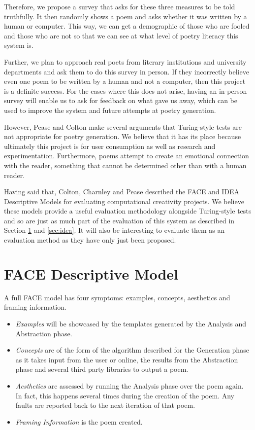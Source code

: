 Therefore, we propose a survey that asks for these three measures to be told truthfully. It then randomly shows a poem and asks whether it was written by a human or computer. This way, we can get a demographic of those who are fooled and those who are not so that we can see at what level of poetry literacy this system is.

Further, we plan to approach real poets from literary institutions and university departments and ask them to do this survey in person. If they incorrectly believe even one poem to be written by a human and not a computer, then this project is a definite success. For the cases where this does not arise, having an in-person survey will enable us to ask for feedback on what gave us away, which can be used to improve the system and future attempts at poetry generation.

However, Pease and Colton\cite{pease2011impact} make several arguments that Turing-style tests are not appropriate for poetry generation. We believe that it has its place because ultimately this project is for user consumption as well as research and experimentation. Furthermore, poems attempt to create an emotional connection with the reader, something that cannot be determined other than with a human reader.

Having said that, Colton, Charnley and Pease\cite{colton2011computational} described the FACE and IDEA Descriptive Models for evaluating computational creativity projects. We believe these models provide a useful evaluation methodology alongside Turing-style tests and so are just as much part of the evaluation of this system as described in Section \ref{sec:face} and \ref{sec:idea}. It will also be interesting to evaluate them as an evaluation method as they have only just been proposed.

\section{FACE Descriptive Model}
\label{sec:face}
A full FACE model has four symptoms: examples, concepts, aesthetics and framing information.

\begin{itemize}
\setlength{\itemsep}{0pt}
\item{\emph{Examples} will be showcased by the templates generated by the Analysis and Abstraction phase.}
\item{\emph{Concepts} are of the form of the algorithm described for the Generation phase as it takes input from the user or online, the results from the Abstraction phase and several third party libraries to output a poem.}
\item{\emph{Aesthetics} are assessed by running the Analysis phase over the poem again. In fact, this happens several times during the creation of the poem. Any faults are reported back to the next iteration of that poem.}
\item{\emph{Framing Information} is the poem created.}
\end{itemize}

